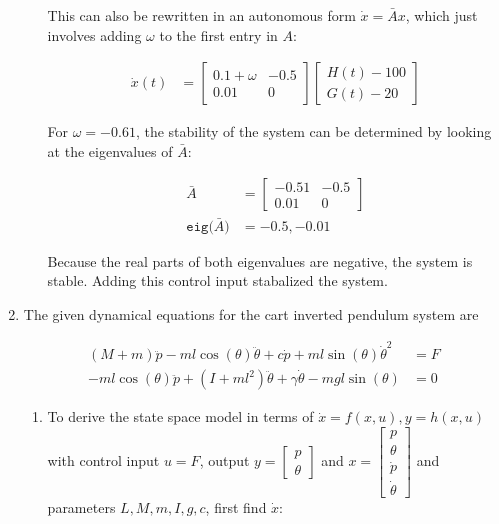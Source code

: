 \documentclass[11pt]{article}
\theoremstyle{definition}
\begin{document}
\begin{enumerate}
\begin{enumerate}
        This can also be rewritten in an autonomous form $\dot{x} = \bar{A}x$, which just involves adding $\omega$ to the first entry in $A$:

        \begin{align}
            \dot{x}(t) &= \begin{bmatrix} 0.1 + \omega & -0.5 \\ 0.01 & 0 \end{bmatrix} \begin{bmatrix} H(t) - 100 \\ G(t) - 20 \end{bmatrix}
        \end{align}

        For $\omega = -0.61$, the stability of the system can be determined by looking at the eigenvalues of $\bar{A}$:

        \begin{align}
            \bar{A} &= \begin{bmatrix} -0.51 & -0.5 \\ 0.01 & 0 \end{bmatrix} \\
            \texttt{eig} \big( \bar{A} \big) &= -0.5, -0.01
        \end{align}

        Because the real parts of both eigenvalues are negative, the system is stable.  Adding this control input stabalized the system.

    \end{enumerate}

    \item %
    The given dynamical equations for the cart inverted pendulum system are

    \begin{align}
        (M + m)\ddot{p} - ml \cos (\theta) \ddot{\theta} + c \dot{p} + ml \sin (\theta) \dot{\theta}^2 &= F \label{eqn:3a}\\
        -ml \cos (\theta) \ddot{p} + \left( I + ml^2 \right) \ddot{\theta} + \gamma \dot{\theta} - mgl \sin (\theta) &= 0 \label{eqn:3b}
    \end{align}

    \begin{enumerate}
        \item %

        To derive the state space model in terms of $\dot{x} = f(x,u), y = h(x, u)$ with control input $u = F$, output $y = \begin{bmatrix} p \\ \theta \end{bmatrix}$ and $x = \begin{bmatrix} p \\ \theta \\ \dot{p} \\ \dot{\theta} \end{bmatrix}$ and parameters $L, M, m, I, g, c$, first find $\dot{x}$:


\end{enumerate}
\end{enumerate}
\end{document}
